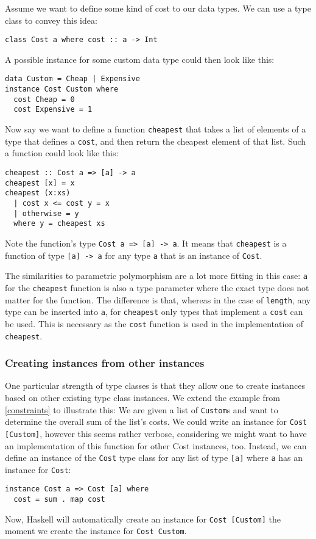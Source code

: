 Assume we want to define some kind of cost to our data types. We can use a type class to convey this idea:
\begin{verbatim}
class Cost a where cost :: a -> Int
\end{verbatim}
A possible instance for some custom data type could then look like this:
\begin{verbatim}
data Custom = Cheap | Expensive
instance Cost Custom where
  cost Cheap = 0
  cost Expensive = 1
\end{verbatim}
Now say we want to define a function \verb|cheapest| that takes a list of elements of a type that defines a \verb|cost|, and then return the cheapest element of that list. Such a function could look like this:
\begin{verbatim}
cheapest :: Cost a => [a] -> a
cheapest [x] = x
cheapest (x:xs)
  | cost x <= cost y = x
  | otherwise = y
  where y = cheapest xs
\end{verbatim}
Note the function's type \verb|Cost a => [a] -> a|. It means that \verb|cheapest| is a function of type \verb|[a] -> a| for any type \verb|a| that is an instance of \verb|Cost|.

The similarities to parametric polymorphism are a lot more fitting in this case: \verb|a| for the \verb|cheapest| function is also a type parameter where the exact type does not matter for the function. The difference is that, whereas in the case of \verb|length|, any type can be inserted into \verb|a|, for \verb|cheapest| only types that implement a \verb|cost| can be used. This is necessary as the \verb|cost| function is used in the implementation of \verb|cheapest|.

\subsubsection{Creating instances from other instances}

One particular strength of type classes is that they allow one to create instances based on other existing type class instances. We extend the example from \autoref{constraints} to illustrate this: We are given a list of \verb|Custom|s and want to determine the overall sum of the list's costs. We could write an instance for \verb|Cost [Custom]|, however this seems rather verbose, considering we might want to have an implementation of this function for other Cost instances, too. Instead, we can define an instance of the \verb|Cost| type class for any list of type \verb|[a]| where \verb|a| has an instance for \verb|Cost|:
\begin{verbatim}
instance Cost a => Cost [a] where
  cost = sum . map cost
\end{verbatim}
Now, Haskell will automatically create an instance for \verb|Cost [Custom]| the moment we create the instance for \verb|Cost Custom|.

